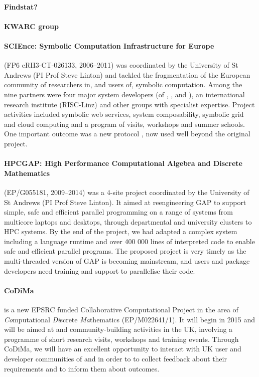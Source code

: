 \paragraph{Findstat?}

\paragraph{KWARC group}

\paragraph{SCIEnce: Symbolic Computation Infrastructure for Europe}
(FP6 eRII3-CT-026133, 2006--2011) was coordinated by the University
of St Andrews (PI Prof Steve Linton) and tackled the fragmentation of the 
European community of researchers in, and users of, symbolic computation. 
Among the nine partners were four major system developers (of \GAP, 
\Maple, \MuPAD and \KANT), an international research institute (RISC-Linz) 
and other groups with specialist expertise. Project activities 
included symbolic web services, system composability, symbolic 
grid and cloud computing and a program of visits, workshops and 
summer schools. One important outcome was a new protocol \SCSCP, 
now used well beyond the original project.

\paragraph{HPCGAP: High Performance Computational Algebra and 
Discrete Mathematics} (EP/G055181, 2009--2014) was a 4-site project
coordinated by the University of St Andrews (PI Prof Steve Linton). It aimed
at reengineering GAP to support simple, safe and efficient parallel 
programming on a range of systems from multicore laptops and desktops, 
through departmental and university clusters to HPC systems. By the 
end of the project, we had adapted a complex system including a 
language runtime and over 400 000 lines of interpreted code to enable 
safe and efficient parallel programs. The proposed project is very timely as
the multi-threaded version of GAP is becoming mainstream, and users and 
package developers need training and support to parallelise their code.

\paragraph{CoDiMa} is a new EPSRC funded Collaborative Computational Project 
in the area of {\em Co}mputational {\em Di}screte {\em Ma}thematics (EP/M022641/1).
It will begin in 2015 and will be aimed at \GAP and \Sage community-building 
activities in the UK, involving a programme of short research visits, workshops 
and training events. Through CoDiMa, we will have an excellent opportunity to
interact with UK user and developer communities of \GAP and \Sage in order to
to collect feedback about their requirements and to inform them about \TheProject 
outcomes.



